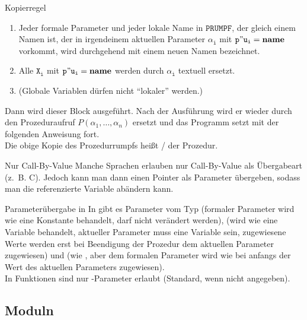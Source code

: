 \begin{Def}{Kopierregel}
\begin{enumerate}
        \item Jeder formale Parameter und jeder lokale Name in
        $\mathtt{PRUMPF}$, der gleich einem Namen ist, der in irgendeinem
        aktuellen Parameter $\mathtt{\alpha_i}$ mit
        $\mathtt{p"u_i = \mathbf{name}}$ vorkommt, wird durchgehend mit einem
        neuen Namen bezeichnet.
        
        \item Alle $\mathtt{X_i}$ mit $\mathtt{p"u_i = \mathbf{name}}$ werden
        durch $\mathtt{\alpha_i}$ textuell ersetzt.
        
        \item (Globale Variablen dürfen nicht "`lokaler"' werden.)
    \end{enumerate}
    
    Dann wird dieser Block ausgeführt.
    Nach der Ausführung wird er wieder durch den Prozeduraufruf
    $P(\alpha_1, \ldots, \alpha_n)$ ersetzt und das Programm setzt
    mit der folgenden Anweisung fort. \\
    Die obige Kopie des Prozedurrumpfs heißt
    / der Prozedur.
\end{Def}

\begin{Def}{Nur Call-By-Value}
    Manche Sprachen erlauben nur Call-By-Value als Übergabeart (z.~B. C).
    Jedoch kann man dann einen Pointer als Parameter übergeben, sodass
    man die referenzierte Variable abändern kann.
\end{Def}

\begin{Def}{Parameterübergabe in \Ada{}}
    In \Ada{} gibt es Parameter vom Typ  (formaler Parameter wird
    wie eine Konstante behandelt, darf nicht verändert werden), 
    (wird wie eine Variable behandelt, aktueller Parameter muss eine Variable
    sein, zugewiesene Werte werden erst bei Beendigung der Prozedur dem
    aktuellen Parameter zugewiesen) und 
    (wie , aber dem formalen Parameter
    wird wie bei  anfangs der Wert des aktuellen Parameters
    zugewiesen). \\
    In Funktionen sind nur -Parameter erlaubt
    (Standard, wenn nicht angegeben).
\end{Def}

\subsection{%
    Moduln%
}


